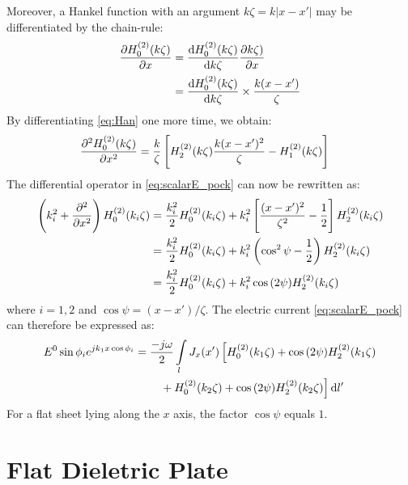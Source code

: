 \documentclass[11pt]{article}
\renewcommand{\O}{\omega}  %
\newcommand{\x}{\times}  %
\renewcommand{\^}{\hat}  %
\newcommand*\diff{\mathop{}\!\mathrm{d}} %
\begin{document}
%
Moreover, a Hankel function with an argument $ k \zeta = k |x - x'|$ may be differentiated by the chain-rule:
%
\begin{equation}
  \begin{split}
    \pdv{H_0^{(2)}(k \zeta)}{x} &= \dv{H_0^{(2)}(k \zeta)}{k \zeta} \pdv{k \zeta)}{x} \\
    &= \dv{H_0^{(2)}(k \zeta)}{k \zeta} \x \frac{k (x - x')}{\zeta}
  \end{split}
  \label{eq:Han}
\end{equation}
%
By differentiating \eqref{eq:Han} one more time, we obtain:
%
\begin{align}
  \pdv[2]{H_0^{(2)}(k \zeta)}{x} &= \frac{k}{\zeta} \left[H_2^{(2)}(k \zeta) \frac{k (x - x')^2}{\zeta} - H_1^{(2)}(k \zeta) \right]
  \label{eq:difHan}
\end{align}
%
The differential operator in \eqref{eq:scalarE_pock} can now be rewritten as:
%
\begin{equation}
  \begin{split}
    \left(k_i^2 + \pdv[2]{}{x} \right) H_0^{(2)}(k_i \zeta) &= \frac{k_i^2}{2} H_0^{(2)}(k_i \zeta) + k_i^2 \left[ \frac{(x-x')^2}{\zeta^2} - \frac{1}{2} \right] H_2^{(2)}(k_i \zeta) \\
    &= \frac{k_i^2}{2} H_0^{(2)}(k_i \zeta) + k_i^2 \left( \cos^2 \psi - \frac{1}{2} \right) H_2^{(2)}(k_i \zeta) \\
    &= \frac{k_i^2}{2} H_0^{(2)}(k_i \zeta) + k_i^2 \cos {(2\psi)} H_2^{(2)}(k_i \zeta)
  \end{split}
  \label{eq:Hankel_final}
\end{equation}
%
where $i = 1,2$ and $ \cos \psi = {(x-x')/\zeta}$. The electric current \eqref{eq:scalarE_pock} can therefore be expressed as:
%
\begin{align}
  E^0 \sin \phi_i  e^{j k_1 x \cos \phi_i} &=  \frac{-j \O}{2} \int\limits_{l} J_x(x') \left[ H_0^{(2)}(k_1 \zeta) + \cos {(2 \psi)} H_2^{(2)}(k_1 \zeta) \right. \notag\\
  &\qquad \left. {} + H_0^{(2)}(k_2 \zeta) + \cos {(2\psi)} H_2^{(2)}(k_2 \zeta)\right]\diff{l'}
  \label{eq:E_final}
\end{align}
%
For a flat sheet lying along the $x$ axis, the factor $\cos \psi$ equals $1$.
\section*{Flat Dieletric Plate}
\end{document}
